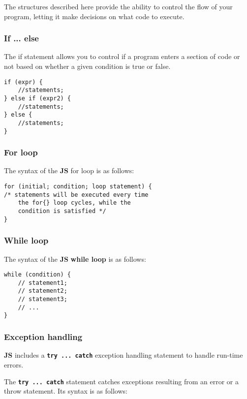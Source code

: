 The structures described here provide the ability to control the flow of your program, letting it make decisions on what code to execute.

\subsubsection{If ... else}

The if statement allows you to control if a program enters a section of code or not based on whether a given condition is true or false.

\begin{lstlisting}[language=uJS]
if (expr) {
	//statements;
} else if (expr2) {
	//statements;
} else {
	//statements;
}
\end{lstlisting}

\subsubsection{For loop}

The syntax of the \textbf{\textmu JS} for loop is as follows:

\begin{lstlisting}[language=uJS]
for (initial; condition; loop statement) {
/* statements will be executed every time
	the for{} loop cycles, while the
	condition is satisfied */
}
\end{lstlisting}

\subsubsection{While loop}

The syntax of the \textbf{\textmu JS} \textbf{while loop} is as follows:

\begin{lstlisting}[language=uJS]
while (condition) {
	// statement1;
	// statement2;
	// statement3;
	// ...
}
\end{lstlisting}

\subsubsection{Exception handling}

\textbf{\textmu JS} includes a \textbf{\texttt{try ... catch}} exception handling statement to handle run-time errors.

The \textbf{\texttt{try ... catch}} statement catches exceptions resulting from an error or a throw statement. Its syntax is as follows:

